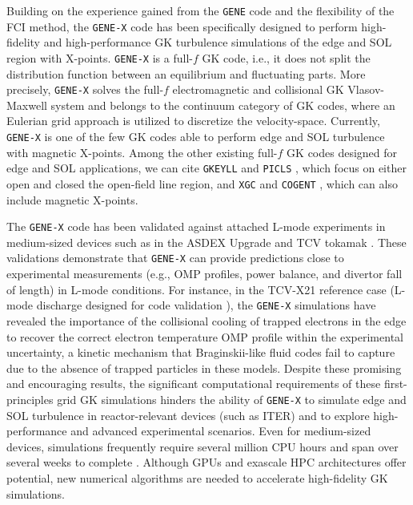 \documentclass[preprint,12pt]{elsarticle}
\begin{document}
Building on the experience gained from the \verb|GENE| code \cite{jenko2000,goerler2011} and the flexibility of the FCI method, the \verb|GENE-X| code \cite{michels2021} has been specifically designed to perform high-fidelity and high-performance GK turbulence simulations of the edge and SOL region with X-points. \verb|GENE-X| is a full-$f$ GK code, i.e., it does not split the distribution function between an equilibrium and fluctuating parts. More precisely, \verb|GENE-X| solves the full-$f$ electromagnetic and collisional GK Vlasov-Maxwell system and belongs to the continuum category of GK codes, where an Eulerian grid approach is utilized to discretize the velocity-space. Currently, \verb|GENE-X| is one of the few GK codes able to perform edge and SOL turbulence with magnetic X-points. Among the other existing full-$f$ GK codes designed for edge and SOL applications, we can cite \verb|GKEYLL| \cite{shi2017} and \verb|PICLS| \cite{boesl2019}, which focus on either open and closed the open-field line region, and \verb|XGC| \cite{ku2009, hager2022} and \verb|COGENT| \cite{dorf2021}, which can also include magnetic X-points. 

The \verb|GENE-X| code has been validated against attached L-mode experiments in medium-sized devices such as in the ASDEX Upgrade \cite{michels2022} and TCV tokamak \cite{ulbl2023}. These validations demonstrate that \verb|GENE-X| can provide predictions close to experimental measurements (e.g., OMP profiles, power balance, and divertor fall of length) in L-mode conditions. For instance, in the TCV-X21 reference case (L-mode discharge designed for code validation \cite{oliveira2022}), the \verb|GENE-X| simulations have revealed the importance of the collisional cooling of trapped electrons in the edge to recover the correct electron temperature OMP profile within the experimental uncertainty, a kinetic mechanism that Braginskii-like fluid codes fail to capture due to the absence of trapped particles in these models. Despite these promising and encouraging results, the significant computational requirements of these first-principles grid GK simulations hinders the ability of \verb|GENE-X| to simulate edge and SOL turbulence in reactor-relevant devices (such as ITER) and to explore high-performance and advanced experimental scenarios. Even for medium-sized devices, simulations frequently require several million CPU hours and span over several weeks to complete \cite{michels2022, ulbl2023}. Although GPUs and exascale HPC architectures offer potential, new numerical algorithms are needed to accelerate high-fidelity GK simulations. 
\end{document}
